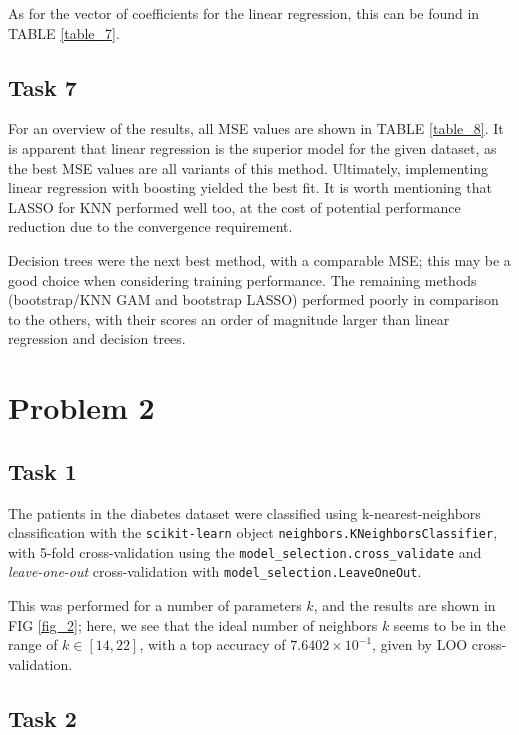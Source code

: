 \documentclass[twoside,twocolumn,10pt]{revtex4-1}
\begin{document}
	As for the vector of coefficients for the linear regression, this can be found in TABLE \ref{table_7}.
	 
	\subsection*{Task 7}
	
	For an overview of the results, all MSE values are shown in TABLE \ref{table_8}.  It is apparent that linear regression is the superior model for the given dataset, as the best MSE values are all variants of this method.  Ultimately, implementing linear regression with boosting yielded the best fit.  It is worth mentioning that LASSO for KNN performed well too, at the cost of potential performance reduction due to the convergence requirement.
	
	Decision trees were the next best method, with a comparable MSE; this may be a good choice when considering training performance.  The remaining methods (bootstrap/KNN GAM and bootstrap LASSO) performed poorly in comparison to the others, with their scores an order of magnitude larger than linear regression and decision trees.

	\section{Problem 2}
	
	\subsection*{Task 1}
	
	The patients in the diabetes dataset were classified using k-nearest-neighbors classification with the \texttt{scikit-learn} object \texttt{neighbors.KNeighborsClassifier}, with 5-fold cross-validation using the \texttt{model\_selection.cross\_validate} and \textit{leave-one-out} cross-validation with \texttt{model\_selection.LeaveOneOut}.  
	
	This was performed for a number of parameters $k$, and the results are shown in FIG \ref{fig_2}; here, we see that the ideal number of neighbors $k$ seems to be in the range of $k \in [14,22]$, with a top accuracy of $7.6402 \times 10^{-1}$, given by LOO cross-validation.
	
	\subsection*{Task 2}
	
\end{document}
